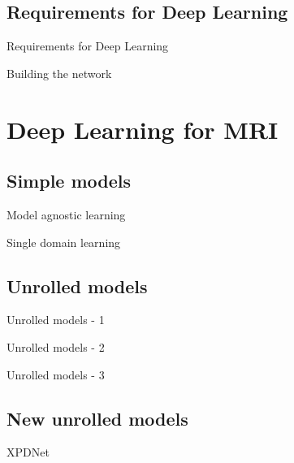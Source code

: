 \documentclass[aspectratio=169,xcolor=dvipsnames]{beamer}
\begin{document}
\subsection{Requirements for Deep Learning}
\begin{frame}{Requirements for Deep Learning}
\end{frame}

\begin{frame}{Building the network}
\end{frame}

\section{Deep Learning for MRI}
\subsection{Simple models}
\begin{frame}{Model agnostic learning}
\end{frame}

\begin{frame}{Single domain learning}
\end{frame}

\subsection{Unrolled models}
\begin{frame}{Unrolled models - 1}
\end{frame}

\begin{frame}{Unrolled models - 2}
\end{frame}

\begin{frame}{Unrolled models - 3}

\end{frame}

\subsection{New unrolled models}
\begin{frame}{XPDNet}
\end{frame}
\end{document}
